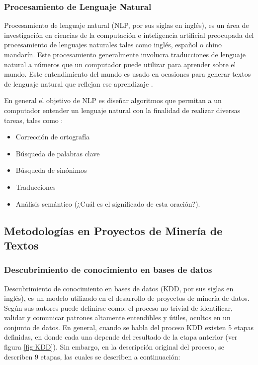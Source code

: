 \subsubsection{Procesamiento de Lenguaje Natural}
    Procesamiento de lenguaje natural (NLP, por sus siglas en inglés), es un área de investigación en ciencias de la computación e inteligencia artificial preocupada del procesamiento de lenguajes naturales tales como inglés, español o chino mandarín. Este procesamiento generalmente involucra traducciones de lenguaje natural a números que un computador puede utilizar para aprender sobre el mundo. Este entendimiento del mundo es usado en ocasiones para generar textos de lenguaje natural que reflejan ese aprendizaje \cite{lane2019natural}. 
    
    En general el objetivo de NLP es diseñar algoritmos que permitan a un computador entender un lenguaje natural con la finalidad de realizar diversas tareas, tales como \cite{NLP-DL}:
    \begin{itemize}
        \item Corrección de ortografía
        \item Búsqueda de palabras clave
        \item Búsqueda de sinónimos
        \item Traducciones
        \item Análisis semántico (¿Cuál es el significado de esta oración?).
    \end{itemize}
\subsection{Metodologías en Proyectos de Minería de Textos}
\subsubsection{Descubrimiento de conocimiento en bases de datos}
    Descubrimiento de conocimiento en bases de datos (KDD, por sus siglas en inglés), \cite{fayyad1996kdd} es un modelo utilizado en el desarrollo de proyectos de minería de datos. Según sus autores puede definirse como: el proceso no trivial de identificar, validar y comunicar patrones altamente entendibles y útiles, ocultos en un conjunto de datos. En general, cuando se habla del proceso KDD existen 5 etapas  definidas, en donde cada una depende del resultado de la etapa anterior (ver figura \ref{fig:KDD}). Sin embargo, en la descripción original del proceso, se describen 9 etapas, las cuales se describen a continuación:

